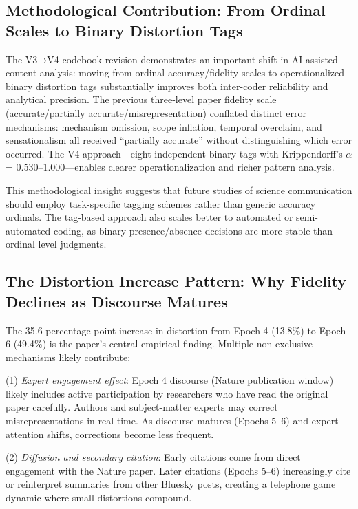 \documentclass[twocolumn,11pt]{article}
\begin{document}
\subsection{Methodological Contribution: From Ordinal Scales to Binary Distortion Tags}

The V3→V4 codebook revision demonstrates an important shift in AI-assisted content analysis: moving from ordinal accuracy/fidelity scales to operationalized binary distortion tags substantially improves both inter-coder reliability and analytical precision. The previous three-level paper fidelity scale (accurate/partially accurate/misrepresentation) conflated distinct error mechanisms: mechanism omission, scope inflation, temporal overclaim, and sensationalism all received ``partially accurate'' without distinguishing which error occurred. The V4 approach—eight independent binary tags with Krippendorff's $\alpha$ = 0.530--1.000—enables clearer operationalization and richer pattern analysis.

This methodological insight suggests that future studies of science communication should employ task-specific tagging schemes rather than generic accuracy ordinals. The tag-based approach also scales better to automated or semi-automated coding, as binary presence/absence decisions are more stable than ordinal level judgments.

\subsection{The Distortion Increase Pattern: Why Fidelity Declines as Discourse Matures}

The 35.6 percentage-point increase in distortion from Epoch 4 (13.8\%) to Epoch 6 (49.4\%) is the paper's central empirical finding. Multiple non-exclusive mechanisms likely contribute:

(1) \textit{Expert engagement effect}: Epoch 4 discourse (Nature publication window) likely includes active participation by researchers who have read the original paper carefully. Authors and subject-matter experts may correct misrepresentations in real time. As discourse matures (Epochs 5--6) and expert attention shifts, corrections become less frequent.

(2) \textit{Diffusion and secondary citation}: Early citations come from direct engagement with the Nature paper. Later citations (Epochs 5--6) increasingly cite or reinterpret summaries from other Bluesky posts, creating a telephone game dynamic where small distortions compound.
\end{document}
